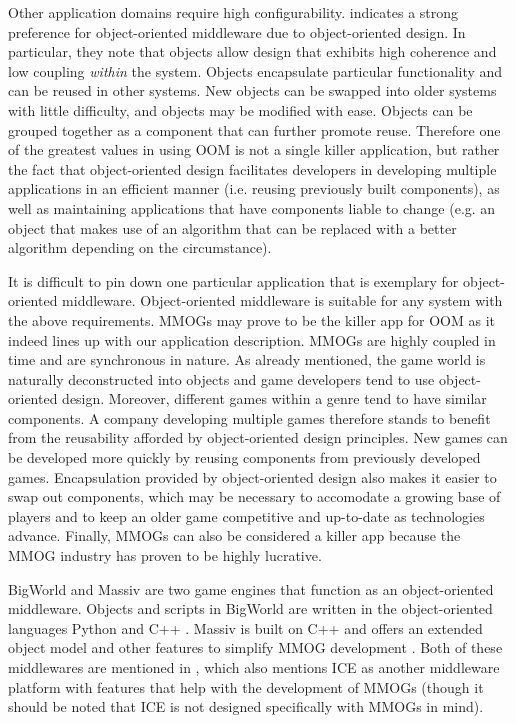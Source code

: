 \documentclass{acm_proc_article-sp}
\begin{document}
Other application domains require high configurability.  \cite{Dipper:2004p8366} indicates a strong preference for object-oriented middleware due to object-oriented design.  In particular, they note that objects allow design that exhibits high coherence and low coupling \textit{within} the system.  Objects encapsulate particular functionality and can be reused in other systems.  New objects can be swapped into older systems with little difficulty, and objects may be modified with ease.  Objects can be grouped together as a component that can further promote reuse.  Therefore one of the greatest values in using OOM is not a single killer application, but rather the fact that object-oriented design facilitates developers in developing multiple applications in an efficient manner (i.e. reusing previously built components), as well as maintaining applications that have components liable to change (e.g. an object that makes use of an algorithm that can be replaced with a better algorithm depending on the circumstance).

It is difficult to pin down one particular application that is exemplary for object-oriented middleware.  Object-oriented middleware is suitable for any system with the above requirements.  MMOGs may prove to be the killer app for OOM as it indeed lines up with our application description.  MMOGs are highly coupled in time and are synchronous in nature.  As already mentioned, the game world is naturally deconstructed into objects and game developers tend to use object-oriented design.  Moreover, different games within a genre tend to have similar components.  A company developing multiple games therefore stands to benefit from the reusability afforded by object-oriented design principles.  New games can be developed more quickly by reusing components from previously developed games.  Encapsulation provided by object-oriented design also makes it easier to swap out components, which may be necessary to accomodate a growing base of players and to keep an older game competitive and up-to-date as technologies advance.  Finally, MMOGs can also be considered a killer app because the MMOG industry has proven to be highly lucrative.

BigWorld and Massiv  are two game engines that function as an object-oriented middleware.  Objects and scripts in BigWorld are written in the object-oriented languages Python and C++ \cite{bigworldtech}.  Massiv is built on C++ and offers an extended object model and other features to simplify MMOG development \cite{massiv}.  Both of these middlewares are mentioned in \cite{Hsiao:2005p8709}, which also mentions ICE as another middleware platform with features that help with the development of MMOGs (though it should be noted that ICE is not designed specifically with MMOGs in mind).
\end{document}
